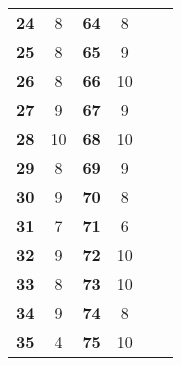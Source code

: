 \documentclass{article}
\begin{document}
\begin{table}[]
\begin{tabular}{cccccc}
		\textbf{24}                     & 8                  & \textbf{64}                     & 8                  &                               &                               \\
		\textbf{25}                     & 8                  & \textbf{65}                     & 9                  &                               &                               \\
		\textbf{26}                     & 8                  & \textbf{66}                     & 10                 &                               &                               \\
		\textbf{27}                     & 9                  & \textbf{67}                     & 9                  &                               &                               \\
		\textbf{28}                     & 10                 & \textbf{68}                     & 10                 &                               &                               \\
		\textbf{29}                     & 8                  & \textbf{69}                     & 9                  &                               &                               \\
		\textbf{30}                     & 9                  & \textbf{70}                     & 8                  &                               &                               \\
		\textbf{31}                     & 7                  & \textbf{71}                     & 6                  &                               &                               \\
		\textbf{32}                     & 9                  & \textbf{72}                     & 10                 &                               &                               \\
		\textbf{33}                     & 8                  & \textbf{73}                     & 10                 &                               &                               \\
		\textbf{34}                     & 9                  & \textbf{74}                     & 8                  &                               &                               \\
		\textbf{35}                     & 4                  & \textbf{75}                     & 10                 &                               &                               \\

\end{tabular}
\end{table}
\end{document}
